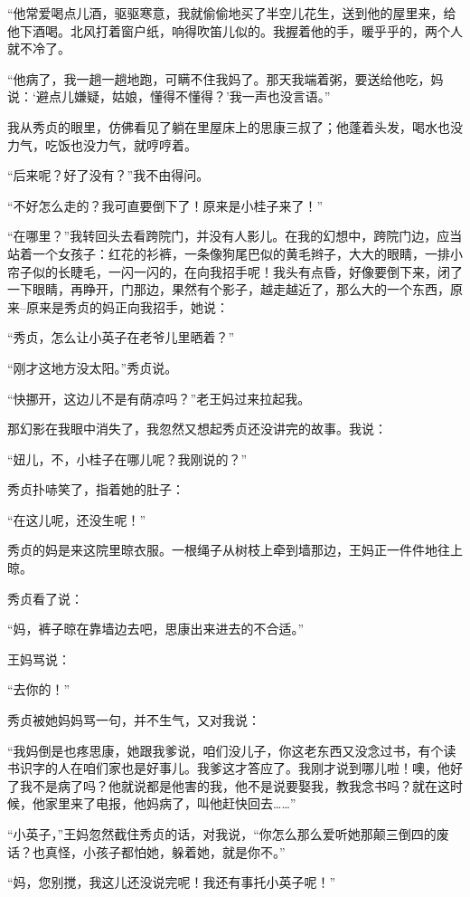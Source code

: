 \par “他常爱喝点儿酒，驱驱寒意，我就偷偷地买了半空儿花生，送到他的屋里来，给他下酒喝。北风打着窗户纸，响得吹笛儿似的。我握着他的手，暖乎乎的，两个人就不冷了。
\par “他病了，我一趟一趟地跑，可瞒不住我妈了。那天我端着粥，要送给他吃，妈说：‘避点儿嫌疑，姑娘，懂得不懂得？’我一声也没言语。”
\par 我从秀贞的眼里，仿佛看见了躺在里屋床上的思康三叔了；他蓬着头发，喝水也没力气，吃饭也没力气，就哼哼着。
\par “后来呢？好了没有？”我不由得问。
\par “不好怎么走的？我可直要倒下了！原来是小桂子来了！”
\par “在哪里？”我转回头去看跨院门，并没有人影儿。在我的幻想中，跨院门边，应当站着一个女孩子：红花的衫裤，一条像狗尾巴似的黄毛辫子，大大的眼睛，一排小帘子似的长睫毛，一闪一闪的，在向我招手呢！我头有点昏，好像要倒下来，闭了一下眼睛，再睁开，门那边，果然有个影子，越走越近了，那么大的一个东西，原来--原来是秀贞的妈正向我招手，她说：
\par “秀贞，怎么让小英子在老爷儿里晒着？”
\par “刚才这地方没太阳。”秀贞说。
\par “快挪开，这边儿不是有荫凉吗？”老王妈过来拉起我。
\par 那幻影在我眼中消失了，我忽然又想起秀贞还没讲完的故事。我说：
\par “妞儿，不，小桂子在哪儿呢？我刚说的？”
\par 秀贞扑哧笑了，指着她的肚子：
\par “在这儿呢，还没生呢！”
\par 秀贞的妈是来这院里晾衣服。一根绳子从树枝上牵到墙那边，王妈正一件件地往上晾。
\par 秀贞看了说：
\par “妈，裤子晾在靠墙边去吧，思康出来进去的不合适。”
\par 王妈骂说：
\par “去你的！”
\par 秀贞被她妈妈骂一句，并不生气，又对我说：
\par “我妈倒是也疼思康，她跟我爹说，咱们没儿子，你这老东西又没念过书，有个读书识字的人在咱们家也是好事儿。我爹这才答应了。我刚才说到哪儿啦！噢，他好了我不是病了吗？他就说都是他害的我，他不是说要娶我，教我念书吗？就在这时候，他家里来了电报，他妈病了，叫他赶快回去……”
\par “小英子，”王妈忽然截住秀贞的话，对我说，“你怎么那么爱听她那颠三倒四的废话？也真怪，小孩子都怕她，躲着她，就是你不。”
\par “妈，您别搅，我这儿还没说完呢！我还有事托小英子呢！”
